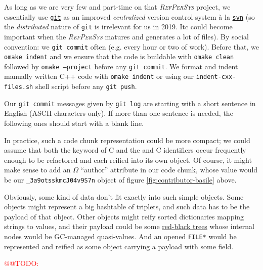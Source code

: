 \documentclass[11pt,a4paper,svgnames]{article}
\newcommand{\RefPerSys}{{\textit{\textsc{RefPerSys}}}}
\begin{document}
As long as we are very few and part-time on that {\RefPerSys} project,
we essentially use \href{https://git-scm.com/}{\texttt{git}} as an
improved \textit{centralized} version control system à la
\href{https://subversion.apache.org/}{\texttt{svn}} (so the
\textit{distributed} nature of \texttt{git} is irrelevant for us in
2019. Itc could become important when the {\RefPerSys} matures and
generates a lot of files).  By social convention: we \texttt{git
  commit} often (e.g. every hour or two of work). Before that, we
\texttt{omake indent} and we ensure that the code is buildable with
\texttt{omake clean} followed by \texttt{omake --project} before any
\texttt{git commit}. We format and indent manually written C++ code
with \texttt{omake indent} or using our \texttt{indent-cxx-files.sh}
shell script before any \texttt{git push}.

Our \texttt{git commit} messages given by \texttt{git log} are
starting with a short sentence in English (ASCII characters only).  If
more than one sentence is needed, the following ones should start with
a blank line.
\clearpage

\printnoidxglossaries

In practice, such a code chunk representation could be more compact;
we could assume that both the {}
keyword of C and the {} and
{} C identifiers occur frequently enough to
be refactored and each reified into its own object. Of course, it
might make sense to add an $\Omega$ ``author'' attribute in our code
chunk, whose value would be our \texttt{\_3a9otsskmcJ04v9S7n} object
of figure \ref{fig:contributor-basile} above.
  
\bigskip

Obviously, some kind of data don't fit exactly into such simple
objects. Some objects might represent a big hashtable of triplets, and
such data has to be the payload of that object. Other objects might
reify sorted dictionaries mapping strings to values, and their
payload could be some
\href{https://en.wikipedia.org/wiki/Red-black_tree}{red-black trees}
whose internal nodes would be GC-managed quasi-values. And an opened
\texttt{FILE*} would be represented and reified as some object
carrying a payload with some {} field.

\smallskip

\textcolor{red}{@@TODO: {}}
\end{document}
